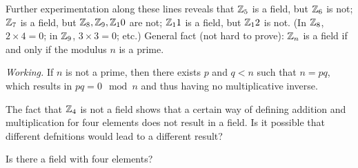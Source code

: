 Further experimentation along these lines reveals that $\mathbb{Z}_5$ is a field, but $\mathbb{Z}_6$ is not; $\mathbb{Z}_7$ is a field, but $\mathbb{Z}_8, \mathbb{Z}_9, \mathbb{Z}_10$ are not; $\mathbb{Z}_11$ is a field, but $\mathbb{Z}_12$ is not. (In $\mathbb{Z}_8$, $2\times4 =0$; in $\mathbb{Z}_9$, $3\times3 = 0$; etc.) General fact (not hard to prove): $\mathbb{Z}_n$ is a field if and only if the modulus $n$ is a prime.

\textit{Working.} If $n$ is not a prime, then there exists $p$ and $q < n$ such that $n = pq$, which results in $pq = 0 \mod n$ and thus having no multiplicative inverse.

The fact that $\mathbb{Z}_4$ is not a field shows that a certain way of defining addition and multiplication for four elements does not result in a field. Is it possible that different defnitions would lead to a different result?

\begin{problem}
Is there a field with four elements?
\end{problem}

